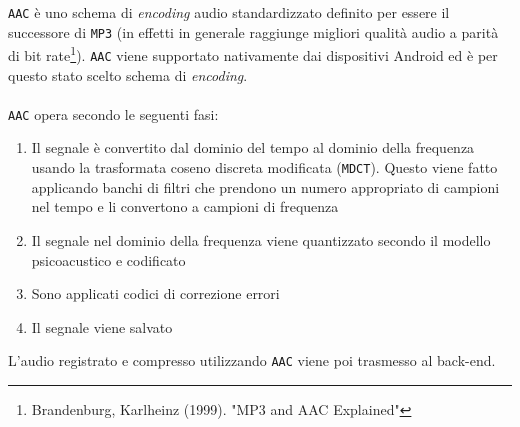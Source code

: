 \texttt{AAC} è uno schema di \textit{encoding} audio standardizzato definito per essere il successore di \texttt{MP3} (in effetti in generale raggiunge migliori qualità audio a parità di bit rate\footnote{Brandenburg, Karlheinz (1999). "MP3 and AAC Explained"}). \texttt{AAC} viene supportato nativamente dai dispositivi Android ed è per questo stato scelto schema di \textit{encoding}.\\

\\

\texttt{AAC} opera secondo le seguenti fasi:

\begin{enumerate}
	\item Il segnale è convertito dal dominio del tempo al dominio della frequenza usando la trasformata coseno discreta modificata (\texttt{MDCT}). Questo viene fatto applicando banchi di filtri che prendono un numero appropriato di campioni nel tempo e li convertono a campioni di frequenza
	\item Il segnale nel dominio della frequenza viene quantizzato secondo il modello psicoacustico e codificato
	\item Sono applicati codici di correzione errori
	\item Il segnale viene salvato
\end{enumerate}

L'audio registrato e compresso utilizzando \texttt{AAC} viene poi trasmesso al back-end.

